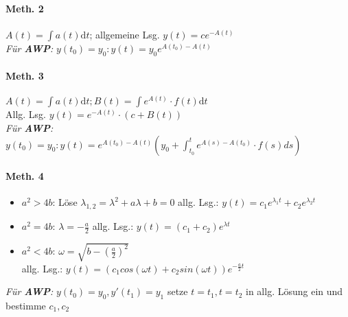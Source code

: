 \documentclass[paper=a3,paper=landscape, fontsize=9pt, DIV=30]{scrartcl}
\begin{document}
\begin{multicols*}{4}
  \paragraph{Meth. 2}
  $A(t)=\int a(t)\mathrm{d}t$; allgemeine Lsg. $y(t)=ce^{-A(t)}$\\
  \textit{Für \textbf{AWP}:} $y(t_0)=y_0: y(t)=y_0e^{A(t_0)-A(t)}$

  \paragraph{Meth. 3}
  $A(t)=\int a(t)\mathrm{d}t; B(t)=\int e^{A(t)} \cdot f(t) \mathrm{d}t$\\
  Allg. Lsg. $y(t)=e^{-A(t)} \cdot (c+B(t))$\\
  \textit{Für \textbf{AWP}:} $y(t_0)=y_0: y(t)=e^{A(t_0)-A(t)}(y_0+\int_{t_0}^{t}e^{A(s)-A(t_0)}\cdot f(s) ds)$

  \paragraph{Meth. 4}
  \begin{itemize}
  	\item $a^2>4b$: Löse $\lambda_{1,2}=\lambda^2+a\lambda + b = 0$
  	allg. Lsg.: $y(t)=c_1e^{\lambda_1t}+c_2e^{\lambda_2t}$
  	\item $a^2=4b$: $\lambda = - \frac{a}{2}$
  	allg. Lsg.: $y(t)=(c_1+c_2)e^{\lambda t}$
  	\item $a^2<4b$: $\omega = \sqrt{b - (\frac{a}{2})^2}$\\
  	allg. Lsg.: $y(t)=(c_1cos(\omega t) + c_2sin(\omega t))e^{-\frac{a}{2}t}$
  \end{itemize}
\textit{Für \textbf{AWP}:} $y(t_0)=y_0, y'(t_1)=y_1$ setze $t=t_1, t=t_2$ in allg. Lösung ein und bestimme $c_1,c_2$


\end{multicols*}
\end{document}
